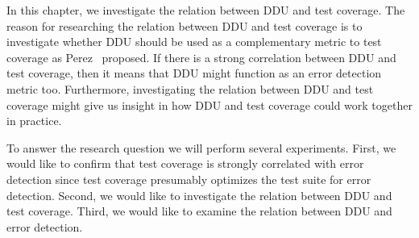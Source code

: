 \documentclass[twoside,a4paper,11pt]{memoir}
\begin{document}
In this chapter, we investigate the relation between DDU and test coverage.
The reason for researching the relation between DDU and test coverage is to investigate whether DDU should be used as a complementary metric to test coverage as Perez \etal\ proposed.
If there is a strong correlation between DDU and test coverage, then it means that DDU might function as an error detection metric too.
Furthermore, investigating the relation between DDU and test coverage might give us insight in how DDU and test coverage could work together in practice.

To answer the research question we will perform several experiments.
First, we would like to confirm that test coverage is strongly correlated with error detection since test coverage presumably optimizes the test suite for error detection.
Second, we would like to investigate the relation between DDU and test coverage.
Third, we would like to examine the relation between DDU and error detection.
\end{document}
